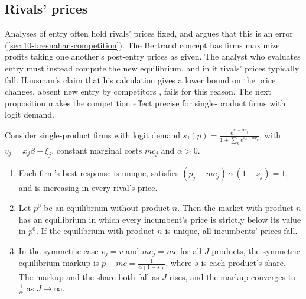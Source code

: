 \subsection{Rivals' prices}\label{sec:10-rival-prices}

Analyses of entry often hold rivals' prices fixed, and \citet[p.~244]{Bresnahan1997} argues that this is an
error (\cref{sec:10-bresnahan-competition}). The Bertrand concept has firms maximize profits taking one another's post-entry prices as
given. The analyst who evaluates entry must instead compute the new equilibrium, and in it rivals' prices
typically fall. Hausman's claim that his calculation gives a lower bound on the price changes, absent new entry
by competitors \citep[p.~233]{Hausman1997}, fails for this reason. The next proposition makes the competition
effect precise for single-product firms with logit demand.

\begin{proposition}\label{prop:10-logit-rivals}
Consider single-product firms with logit demand
$s_j(p) = \frac{e^{v_j - \alpha p_j}}{1 + \sum_ke^{v_k - \alpha p_k}}$, with $v_j = x_j\beta + \xi_j$, constant
marginal costs $mc_j$ and $\alpha > 0$.
\begin{enumerate}[label=(\alph*)]
  \item Each firm's best response is unique, satisfies $(p_j - mc_j)\,\alpha\,(1 - s_j) = 1$, and is increasing
  in every rival's price.
  \item Let $p^0$ be an equilibrium without product $n$. Then the market with product $n$ has an equilibrium
  in which every incumbent's price is strictly below its value in $p^0$. If the equilibrium with product $n$ is
  unique, all incumbents' prices fall.
  \item In the symmetric case $v_j = v$ and $mc_j = mc$ for all $J$ products, the symmetric equilibrium markup
  is $p - mc = \frac{1}{\alpha(1 - s)}$, where $s$ is each product's share. The markup and the share both fall
  as $J$ rises, and the markup converges to $\frac{1}{\alpha}$ as $J \to \infty$.
\end{enumerate}
\end{proposition}

